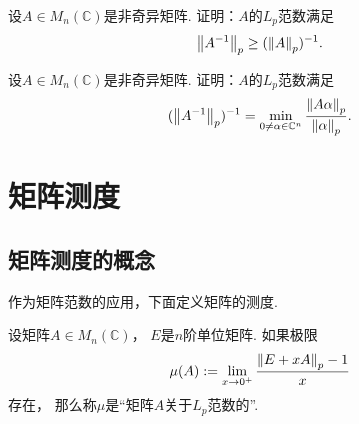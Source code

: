 \begin{example}
设\(A \in M_n(\mathbb{C})\)是非奇异矩阵.
证明：\(A\)的\(L_p\)范数满足
\begin{equation*}
	\norm{A^{-1}}_p \geq (\norm{A}_p)^{-1}.
\end{equation*}
\end{example}

\begin{example}
设\(A \in M_n(\mathbb{C})\)是非奇异矩阵.
证明：\(A\)的\(L_p\)范数满足
\begin{equation*}
	(\norm{A^{-1}}_p)^{-1}
	= \min_{0 \neq \alpha \in \mathbb{C}^n} \frac{\norm{A \alpha}_p}{\norm{\alpha}_p}.
\end{equation*}
\end{example}

\section{矩阵测度}
\subsection{矩阵测度的概念}
作为矩阵范数的应用，下面定义矩阵的测度.
\begin{definition}
设矩阵\(A \in M_n(\mathbb{C})\)，
\(E\)是\(n\)阶单位矩阵.
如果极限\begin{equation*}
	\mu(A)
	:=
	\lim_{x \to 0^+}
	\frac{
		\norm{E + x A}_p - 1
	}{x}
\end{equation*}
存在，
那么称\(\mu\)是“矩阵\(A\)关于\(L_p\)范数的”.
\end{definition}


